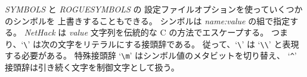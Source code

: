 {\it SYMBOLS\/} と {\it ROGUESYMBOLS\/} の
設定ファイルオプションを使っていくつかのシンボルを
上書きすることもできる。
シンボルは {\it name:value\/} の組で指定する。
{\it NetHack\/} は {\it value\/} 文字列を伝統的な C の方法でエスケープする。
つまり、`\verb+\+' は次の文字をリテラルにする接頭辞である。
従って、`\verb+\+' は `\verb+\\+' と表現する必要がある。
特殊接頭辞 `\verb+\m+' はシンボル値のメタビットを切り替え、
`{\tt \^{}}' 接頭辞は引き続く文字を制御文字として扱う。

